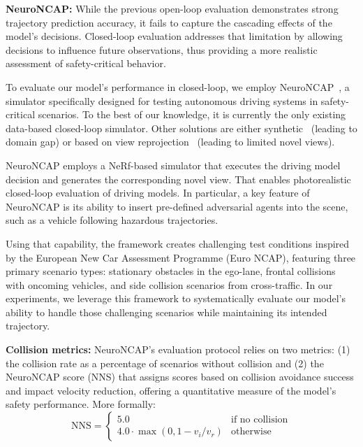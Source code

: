 \textbf{NeuroNCAP:} While the previous open-loop evaluation demonstrates strong trajectory prediction accuracy, it fails to capture the cascading effects of the model's decisions. Closed-loop evaluation addresses that limitation by allowing decisions to influence future observations, thus providing a more realistic assessment of safety-critical behavior.

To evaluate our model's performance in closed-loop, we employ NeuroNCAP~\cite{ljungbergh2024neuroncap}, a simulator specifically designed for testing autonomous driving systems in safety-critical scenarios. To the best of our knowledge, it is currently the only existing data-based closed-loop simulator. Other solutions are either synthetic~\cite{dosovitskiy2017carla} (leading to domain gap) or based on view reprojection~\cite{amini2020vista,amini2022vista2} (leading to limited novel views). 

NeuroNCAP employs a NeRf-based simulator that executes the driving model decision and generates the corresponding novel view. That enables photorealistic closed-loop evaluation of driving models. In particular, a key feature of NeuroNCAP is its ability to insert pre-defined adversarial agents into the scene, such as a vehicle following hazardous trajectories. 

Using that capability, the framework creates challenging test conditions inspired by the European New Car Assessment Programme (Euro NCAP), featuring three primary scenario types: stationary obstacles in the ego-lane, frontal collisions with oncoming vehicles, and side collision scenarios from cross-traffic. In our experiments, we leverage this framework to systematically evaluate our \vam model's ability to handle those challenging scenarios while maintaining its intended trajectory. \newline

\noindent \textbf{Collision metrics:} NeuroNCAP's evaluation protocol relies on two metrics: (1) the collision rate as a percentage of scenarios without collision and (2) the NeuroNCAP score (NNS) that assigns scores based on collision avoidance success and impact velocity reduction, offering a quantitative measure of the model's safety performance. More formally:
%
\begin{equation}
    \text{NNS} = \begin{cases}
        5.0 & \text{if no collision} \\
        4.0 \cdot \max(0, 1 - v_i/v_r) & \text{otherwise}
    \end{cases}
\end{equation}
\newline


